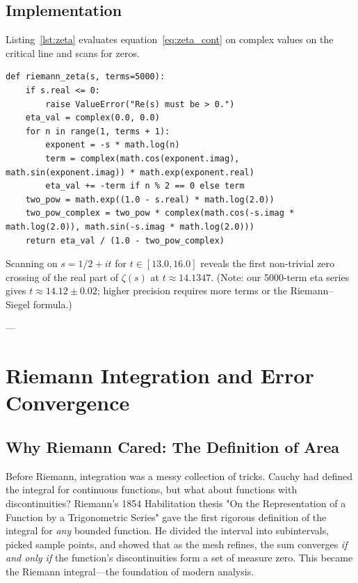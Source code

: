 \documentclass[11pt]{amsart}
\theoremstyle{definition}
\begin{document}
\subsection{Implementation}
Listing~\ref{lst:zeta} evaluates equation~\eqref{eq:zeta_cont} on complex values on the critical line and scans for zeros.

\begin{lstlisting}[caption={Riemann Zeta function calculation on the critical line.}, label={lst:zeta}]
def riemann_zeta(s, terms=5000):
    if s.real <= 0:
        raise ValueError("Re(s) must be > 0.")
    eta_val = complex(0.0, 0.0)
    for n in range(1, terms + 1):
        exponent = -s * math.log(n)
        term = complex(math.cos(exponent.imag), math.sin(exponent.imag)) * math.exp(exponent.real)
        eta_val += -term if n % 2 == 0 else term
    two_pow = math.exp((1.0 - s.real) * math.log(2.0))
    two_pow_complex = two_pow * complex(math.cos(-s.imag * math.log(2.0)), math.sin(-s.imag * math.log(2.0)))
    return eta_val / (1.0 - two_pow_complex)
\end{lstlisting}

Scanning on $s = 1/2 + it$ for $t \in [13.0, 16.0]$ reveals the first non-trivial zero crossing of the real part of $\zeta(s)$ at $t \approx 14.1347$. (Note: our 5000-term eta series gives $t \approx 14.12 \pm 0.02$; higher precision requires more terms or the Riemann--Siegel formula.)

---

\section{Riemann Integration and Error Convergence}
\label{sec:integration}

\subsection{Why Riemann Cared: The Definition of Area}
Before Riemann, integration was a messy collection of tricks. Cauchy had defined the integral for continuous functions, but what about functions with discontinuities? Riemann's 1854 Habilitation thesis "On the Representation of a Function by a Trigonometric Series" gave the first rigorous definition of the integral for \textit{any} bounded function. He divided the interval into subintervals, picked sample points, and showed that as the mesh refines, the sum converges \textit{if and only if} the function's discontinuities form a set of measure zero. This became the Riemann integral---the foundation of modern analysis.
\end{document}
